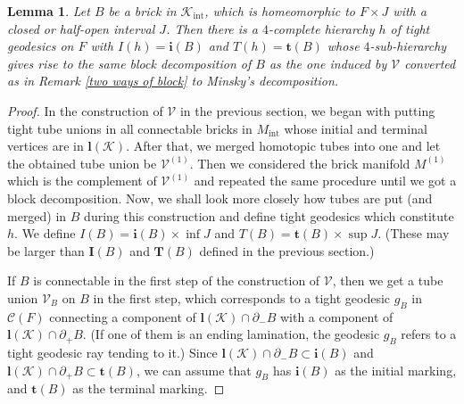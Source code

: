 \documentclass{amsart}
\newtheorem{lemma}[theorem]{Lemma}
\theoremstyle{definition}
\numberwithin{figure}{section}
\numberwithin{equation}{section}
\newcommand{\blackboard}[1]{\ensuremath{\mathbb{#1}}}
\newcommand{\complexes}{\blackboard{C}}
\def\cc{\complexes}
\def\cc{\mathcal{C}}
\def\ck{\mathcal{K}}
\def\cv{\mathcal{V}}
\begin{document}
\begin{lemma}
\label{hierarchy}
Let $B$ be a brick in $\mathcal{K}_\mathrm{int}$, which is homeomorphic to $F \times J$ with a closed or half-open interval $J$.
Then there is a $4$-complete hierarchy $h$ of tight geodesics on $F$ with $I(h)=\boldsymbol{i}(B)$ and $T(h)=\boldsymbol{t}(B)$ whose $4$-sub-hierarchy gives rise to the same  block decomposition of $B$ as the one induced by $\cv$ converted as in Remark \ref{two ways of block} to Minsky's decomposition.
\end{lemma}
\begin{proof}
In the construction of  $\cv$ in the previous section, we began with putting tight tube unions in all connectable bricks in $M_\mathrm{int}$ whose initial and terminal vertices are  in $\boldsymbol{l}(\mathcal{K})$.
After that, we merged homotopic tubes into one and let the obtained tube union be $\cv^{(1)}$.
Then we considered the brick manifold $M^{(1)}$ which is the complement of $\cv^{(1)}$ and repeated the same procedure until we got a block decomposition.
Now, we shall look more closely how tubes are put (and merged) in $B$ during this construction and define  tight geodesics which constitute $h$.
We define $I(B)=\boldsymbol{i}(B) \times \inf J$ and $T(B)=\boldsymbol{t}(B) \times \sup J$.
(These may be larger than $\boldsymbol{I}(B)$ and $\boldsymbol{T}(B)$ defined in the previous section.)



If $B$ is connectable in the first step of the construction of $\cv$, then we get a tube union $\cv_B$ on $B$ in the first step, which corresponds to a tight geodesic $g_B$ in $\cc(F)$ connecting a component of $\boldsymbol{l}(\ck) \cap \partial_- B$ with a component of $\boldsymbol{l}(\ck) \cap \partial_+ B$.
(If one of them is an ending lamination, the geodesic $g_B$ refers to a tight geodesic ray tending to it.) 
Since $\boldsymbol{l}(\ck) \cap \partial_- B \subset \boldsymbol{i}(B)$ and $\boldsymbol{l}(\ck) \cap \partial_+ B \subset \boldsymbol{t}(B)$, we can assume that $g_B$ has $\boldsymbol{i}(B)$ as the initial marking, and $\boldsymbol{t}(B)$ as the terminal marking.



\end{proof}
\end{document}
